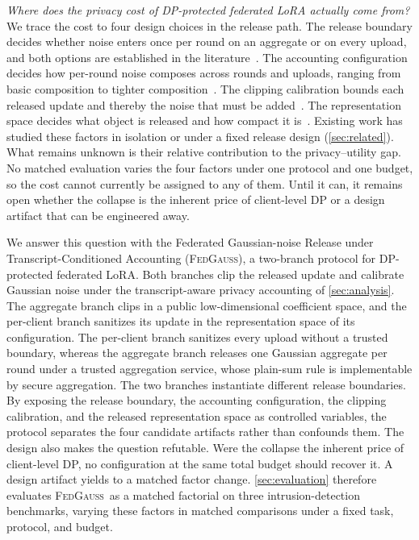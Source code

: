 \documentclass[a4paper,fleqn]{cas-dc}
\newcommand{\method}{\textsc{FedGauss}}
\begin{document}
\textit{Where does the privacy cost of DP-protected federated LoRA actually come from?} We trace the cost to four design choices in the release path. The release boundary decides whether noise enters once per round on an aggregate or on every upload, and both options are established in the literature~\cite{mcmahan2018dpfedavg,wei2020federateddp}. The accounting configuration decides how per-round noise composes across rounds and uploads, ranging from basic composition to tighter composition~\cite{dwork2014algorithmic,bun2016concentrated}. The clipping calibration bounds each released update and thereby the noise that must be added~\cite{abadi2016deep}. The representation space decides what object is released and how compact it is~\cite{hu2022lora}. Existing work has studied these factors in isolation or under a fixed release design (\cref{sec:related}). What remains unknown is their relative contribution to the privacy--utility gap. No matched evaluation varies the four factors under one protocol and one budget, so the cost cannot currently be assigned to any of them. Until it can, it remains open whether the collapse is the inherent price of client-level DP or a design artifact that can be engineered away.
\par
We answer this question with the Federated Gaussian-noise Release under Transcript-Conditioned Accounting (\method), a two-branch protocol for DP-protected federated LoRA. Both branches clip the released update and calibrate Gaussian noise under the transcript-aware privacy accounting of \cref{sec:analysis}. The aggregate branch clips in a public low-dimensional coefficient space, and the per-client branch sanitizes its update in the representation space of its configuration. The per-client branch sanitizes every upload without a trusted boundary, whereas the aggregate branch releases one Gaussian aggregate per round under a trusted aggregation service, whose plain-sum rule is implementable by secure aggregation. The two branches instantiate different release boundaries. By exposing the release boundary, the accounting configuration, the clipping calibration, and the released representation space as controlled variables, the protocol separates
the four candidate artifacts rather than confounds them. The design also makes the question refutable. Were the collapse the inherent price of client-level DP, no configuration at the same total budget should recover it. A design artifact yields to a matched factor change. \cref{sec:evaluation} therefore evaluates \method\ as a matched factorial on three intrusion-detection benchmarks, varying these factors in matched comparisons under a fixed task, protocol, and budget.
\end{document}
